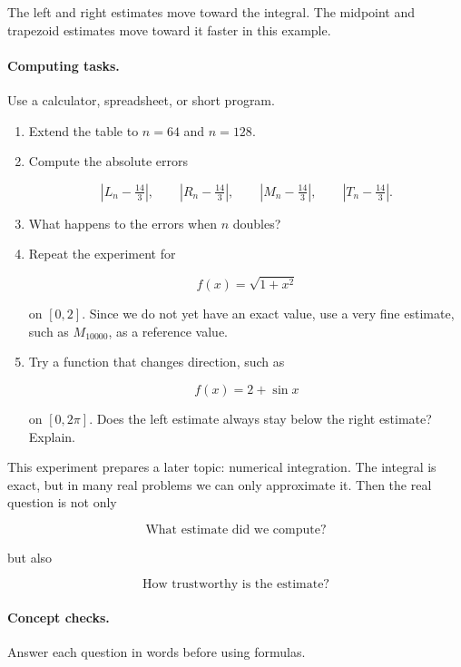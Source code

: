 The left and right estimates move toward the integral.  The midpoint and trapezoid
estimates move toward it faster in this example.

\paragraph{Computing tasks.}
Use a calculator, spreadsheet, or short program.

\begin{enumerate}
\item Extend the table to \(n=64\) and \(n=128\).

\item Compute the absolute errors

\[
|L_n-\tfrac{14}{3}|,
\qquad
|R_n-\tfrac{14}{3}|,
\qquad
|M_n-\tfrac{14}{3}|,
\qquad
|T_n-\tfrac{14}{3}|.
\]

\item What happens to the errors when \(n\) doubles?

\item Repeat the experiment for

\[
f(x)=\sqrt{1+x^2}
\]

on \([0,2]\).  Since we do not yet have an exact value, use a very fine estimate,
such as \(M_{10000}\), as a reference value.

\item Try a function that changes direction, such as

\[
f(x)=2+\sin x
\]

on \([0,2\pi]\).  Does the left estimate always stay below the right estimate?
Explain.
\end{enumerate}

This experiment prepares a later topic: numerical integration.  The integral is exact,
but in many real problems we can only approximate it.  Then the real question is not
only

\[
\text{What estimate did we compute?}
\]

but also

\[
\text{How trustworthy is the estimate?}
\]

\paragraph{Concept checks.}
Answer each question in words before using formulas.

